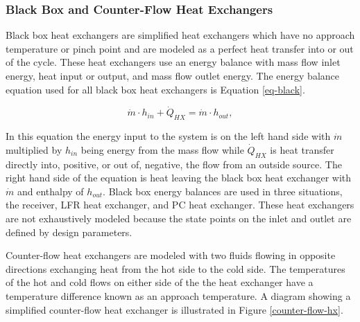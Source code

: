 
\subsubsection{Black Box and Counter-Flow Heat Exchangers}

Black box heat exchangers are simplified heat exchangers which have no approach temperature or pinch point and are modeled as a perfect heat transfer into or out of the cycle. These heat exchangers use an energy balance with mass flow inlet energy, heat input or output, and mass flow outlet energy. The energy balance equation used for all black box heat exchangers is Equation \ref{eq-black}.



\begin{equation}
    \label{eq-black}
    \dot{m} \cdot h_{in} + \dot{Q}_{HX} = \dot{m} \cdot h_{out} ,
\end{equation}

In this equation the energy input to the system is on the left hand side with $\dot{m}$ multiplied by $h_{in}$ being energy from the mass flow while $\dot{Q}_{HX}$ is heat transfer directly into, positive, or out of, negative, the flow from an outside source. The right hand side of the equation is heat leaving the black box heat exchanger with $\dot{m}$ and enthalpy of $h_{out}$. Black box energy balances are used in three situations, the receiver, LFR heat exchanger, and PC heat exchanger. These heat exchangers are not exhaustively modeled because the state points on the inlet and outlet are defined by design parameters.

Counter-flow heat exchangers are modeled with two fluids flowing in opposite directions exchanging heat from the hot side to the cold side. The temperatures of the hot and cold flows on either side of the the heat exchanger have a temperature difference known as an approach temperature. A diagram showing a simplified counter-flow heat exchanger is illustrated in Figure \ref{counter-flow-hx}.

